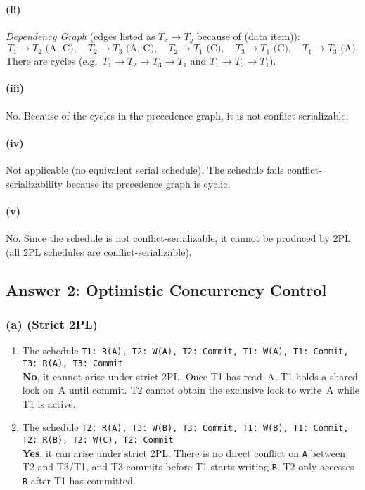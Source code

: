 \documentclass[11pt]{article}
\begin{document}
\paragraph{(ii)}
\emph{Dependency Graph} (edges listed as {\small $T_x \to T_y$ because of (data item)}):
\[
T_1 \to T_2 \text{ (A, C)}, \quad
T_2 \to T_3 \text{ (A, C)}, \quad
T_2 \to T_1 \text{ (C)}, \quad
T_3 \to T_1 \text{ (C)}, \quad 
T_1 \to T_3 \text{ (A)}.
\]
There are cycles (e.g.\ $T_1 \to T_2 \to T_3 \to T_1$ and $T_1 \to T_2 \to T_1$).

\paragraph{(iii)}
No. Because of the cycles in the precedence graph, it is not conflict-serializable.

\paragraph{(iv)}
Not applicable (no equivalent serial schedule). The schedule fails conflict-serializability because its precedence graph is cyclic.

\paragraph{(v)}
No. Since the schedule is not conflict-serializable, it cannot be produced by 2PL (all 2PL schedules are conflict-serializable).

\subsection*{Answer 2: Optimistic Concurrency Control}

\subsubsection*{(a) \; (Strict 2PL)}
\begin{enumerate}
  \item The schedule \texttt{T1: R(A), T2: W(A), T2: Commit, T1: W(A), T1: Commit, T3: R(A), T3: Commit} \\
  \textbf{No}, it cannot arise under strict 2PL. Once T1 has read~A, T1 holds a shared lock on~A until commit. T2 cannot obtain the exclusive lock to write~A while T1 is active.

  \item The schedule \texttt{T2: R(A), T3: W(B), T3: Commit, T1: W(B), T1: Commit, T2: R(B), T2: W(C), T2: Commit} \\
  \textbf{Yes}, it can arise under strict 2PL. There is no direct conflict on \texttt{A} between T2 and T3/T1, and T3 commits before T1 starts writing \texttt{B}. T2 only accesses \texttt{B} after T1 has committed.
\end{enumerate}
\end{document}
